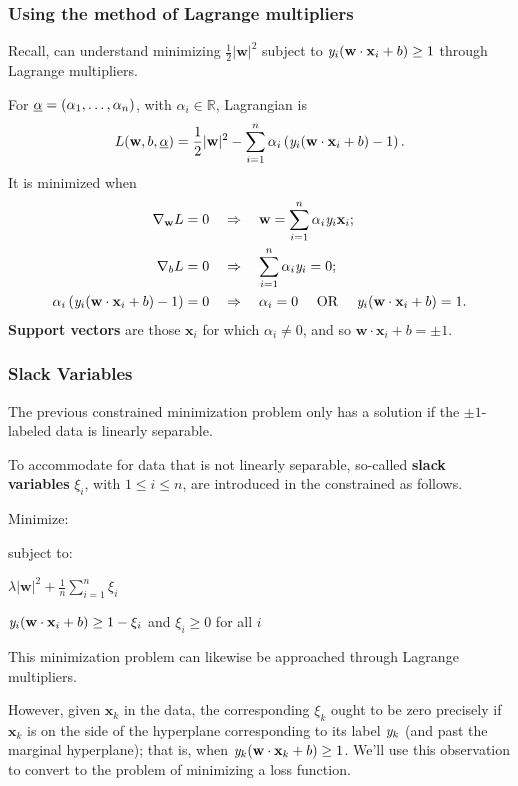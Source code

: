 \documentclass[smaller]{beamer}
\theoremstyle{example}
\newcommand{\x}{\textbf{x}}
\newcommand{\ix}[1]{{\it #1}}
\begin{document}
\begin{frame}
\frametitle{Using the method of Lagrange multipliers}
Recall, can understand minimizing $\frac12|\textbf{w}|^2$ subject to $\ix y_i(\textbf{w}\cdot{\x}_i + b) \ge 1$ through Lagrange multipliers.

\pause
For $\emph{\alpha}=(\alpha_1,\ldots,\alpha_n)$, with $\alpha_i\in\mathbb R$, Lagrangian is 
    \[L(\textbf{w}, b, \emph{\alpha}) = \frac12|\textbf{w}|^2 - \sum_{i=1}^n\alpha_i\left(\ix y_i(\textbf{w}\cdot\x_i + b) - 1\right).\]
It is minimized when 
    \begin{align*}
        \nabla_{\textbf{w}}L = 0  &\quad\Rightarrow\quad \textbf{w} = \sum_{i=1}^n\alpha_i\ix y_i\x_i; \\
        \nabla_{b}L = 0  &\quad\Rightarrow\quad \sum_{i=1}^n\alpha_i\ix y_i = 0; \\ 
        \alpha_i\left(\ix y_i(\textbf{w}\cdot\x_i + b)-1\right) = 0 &\quad\Rightarrow\quad 
         \alpha_i = 0 \quad\text{ OR }\quad \ix y_i(\textbf{w}\cdot\x_i + b) = 1.
    \end{align*}
\pause
\textbf{Support vectors} are those $\x_i$ for which $\alpha_i\ne0$, and so $\textbf{w}\cdot\x_i + b = \pm 1$.
\end{frame}

\begin{frame}
    \frametitle{Slack Variables}
    The previous constrained minimization problem only has a solution if the $\pm 1$-labeled data is linearly separable. 
    
    \pause
    To accommodate for data that is not linearly separable, so-called \textbf{slack variables} $\xi_i$, with $1\le i\le n$, are introduced in the constrained as follows.

    \medskip
    \begin{minipage}{0.4\textwidth}
        Minimize: 

        \vspace{12pt}
        subject to:
    \end{minipage}
    \begin{minipage}{0.5\textwidth}
        $\lambda|\textbf{w}|^2 + \frac{1}{n}\sum_{i=1}^n\xi_i$

        \vspace{12pt}
        $\ix y_i(\textbf{w}\cdot{\x}_i + b) \ge 1 - \xi_i$ and $\xi_i \ge 0$ for all $i$
    \end{minipage}

    \pause
    \vspace{12pt}
    This minimization problem can likewise be approached through Lagrange multipliers. 
    
    \pause
    However, given $\x_{k}$ in the data, the corresponding $\xi_{k}$ ought to be zero precisely if $\x_{k}$ is on the side of the hyperplane corresponding to its label $\ix y_{k}$ (and past the marginal hyperplane); that is, when $\ix y_{k}(\textbf{w}\cdot\x_{k} + b) \ge 1$. We'll use this observation to convert to the problem of minimizing a loss function.
\end{frame}
\end{document}
